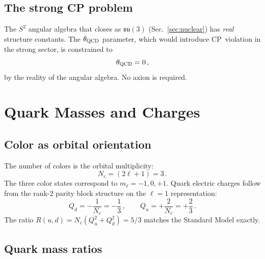 \documentclass[aps,prd,twocolumn,superscriptaddress,nofootinbib,longbibliography]{revtex4-2}
\begin{document}
\subsection{The strong CP problem}

The $S^2$ angular algebra that closes as $\mathfrak{su}(3)$
(Sec.~\ref{sec:nuclear}) has \emph{real} structure constants.
The $\theta_{\rm QCD}$ parameter, which would introduce CP~violation
in the strong sector, is constrained to
\begin{equation}
  \theta_{\rm QCD} = 0\,,
\end{equation}
by the reality of the angular algebra.  No axion is required.

\section{Quark Masses and Charges}\label{sec:quarks}

\subsection{Color as orbital orientation}

The number of colors is the orbital multiplicity:
\begin{equation}
  N_c = (2\ell + 1) = 3\,.
\end{equation}
The three color states correspond to $m_\ell = -1, 0, +1$.  Quark
electric charges follow from the rank-2 parity block structure on the
$\ell = 1$ representation:
\begin{equation}
  Q_d = -\frac{1}{N_c} = -\frac{1}{3}\,,
  \qquad
  Q_u = +\frac{2}{N_c} = +\frac{2}{3}\,.
\end{equation}
The ratio $R(u,d) = N_c(Q_u^2 + Q_d^2) = 5/3$ matches the Standard
Model exactly.

\subsection{Quark mass ratios}
\end{document}
